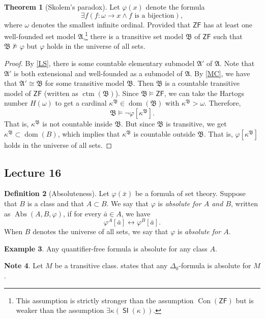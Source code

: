 \documentclass[10pt,letterpaper,cm]{nupset}
\theoremstyle{definition}
\newtheorem{definition}{Definition}[subsection]
\newtheorem{exmp}[definition]{Example}
\newtheorem{note}[definition]{Note}
\theoremstyle{theorem}
\newtheorem{theorem}[definition]{Theorem}
\theoremstyle{remark}
\newcommand{\A}{\mathfrak A}
\newcommand{\B}{\mathfrak{B}}
\newcommand{\1}{\mathbf{1}}
\newcommand{\0}{\vec 0}
\newcommand{\zf}{\mathsf{ZF}}
\DeclareMathOperator{\abs}{Abs}
\DeclareMathOperator{\dom}{dom}
\DeclareMathOperator{\si}{\mathsf{SI}}
\DeclareMathOperator{\con}{Con}
\DeclareMathOperator{\ctm}{ctm}
\begin{document}
\begin{theorem}[Skolem's paradox]
Let $\varphi(x)$ denote the formula $$\exists f\left(f : \omega  \to  x \land f \text{ is a bijection}\right)  ,  $$ where $\omega$ denotes the smallest infinite ordinal. Provided that $\zf$ has at least one well-founded set model $\A$,\footnote{This assumption is strictly stronger than the assumption $\con(\zf)$ but is weaker than the assumption $\exists \kappa(\si(\kappa))$.} there is a transitive set model $\B$ of $\zf$ such that $\B \nvDash \varphi$ but $\varphi$ holds in the universe of all sets.
\end{theorem}
\begin{proof}
By \cref{LS}, there is some countable elementary submodel $\A'$ of $\A$. Note that $\A'$ is both extensional and well-founded as a submodel of $\A$. By \cref{MC}, we have that $\A' \cong \B$ for some transitive model $\B$. Then $\B$ is a countable transitive model of $\zf$ (written as $\ctm(\B)$). Since $\B \models \zf$, we can take the Hartogs number $H(\omega)$ to get a cardinal $\kappa^{\B} \in \dom(\B)$ with $\kappa^{\B} > \omega$. Therefore, $$\B \models \neg{\varphi\left[\kappa^{\B}\right]}.$$ That is, $\kappa^{\B}$ is not countable inside $\B$. But since $\B$ is transitive, we get $\kappa^{\B} \subset \dom(B)$, which implies that $\kappa^{\B}$ is countable outside $\B$. That is, $\varphi\left[\kappa^{\B}\right]$ holds in the universe of all sets.
\end{proof}

\subsection{Lecture 16}

\begin{definition}[Absoluteness] Let $\varphi(\bar{x})$ be a formula of set theory. Suppose that $B$ is a class and that $A\subset B$. We say that $\varphi$ is \textit{absolute for $A$ and $B$}, written as $\abs(A,B, \varphi)$, if for every $\bar{a}\in A$, we have $$\varphi^A\left[\bar{a}\right] \leftrightarrow \varphi^B\left[\bar{a}\right].$$ When $B$ denotes the universe of all sets, we say that $\varphi$ is \textit{absolute for $A$}.
\end{definition}

\begin{exmp}
Any quantifier-free formula is  absolute for any class $A$.
\end{exmp}

\begin{note}
Let $M$ be a transitive class.  states that any $\Delta_0$-formula is absolute for $M$.
\end{note}
\end{document}
